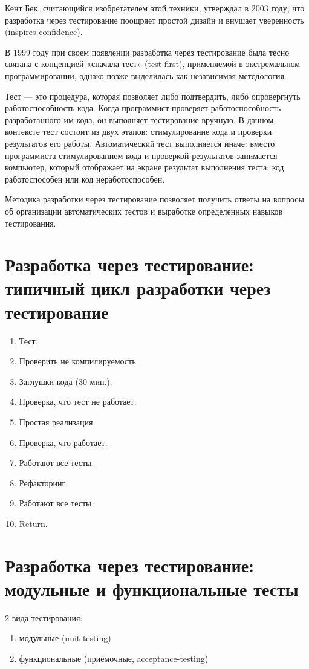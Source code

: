 \documentclass{article}
\let\stdsection\section
\renewcommand\section{\newpage\stdsection}
\begin{document}
    Кент Бек, считающийся изобретателем этой техники, утверждал в 2003 году, что разработка через тестирование поощряет простой дизайн и внушает уверенность (inspires confidence).

    В 1999 году при своем появлении разработка через тестирование была тесно связана с концепцией «сначала тест» (test-first), применяемой в экстремальном программировании, однако позже выделилась как независимая методология.

    Тест — это процедура, которая позволяет либо подтвердить, либо опровергнуть работоспособность кода. Когда программист проверяет работоспособность разработанного им кода, он выполняет тестирование вручную. В данном контексте тест состоит из двух этапов: стимулирование кода и проверки результатов его работы. Автоматический тест выполняется иначе: вместо программиста стимулированием кода и проверкой результатов занимается компьютер, который отображает на экране результат выполнения теста: код работоспособен или код неработоспособен. 

    Методика разработки через тестирование позволяет получить ответы на вопросы об организации автоматических тестов и выработке определенных навыков тестирования.

\section{Разработка через тестирование: типичный цикл разработки через тестирование}
    \begin{enumerate}
        \item Тест.
        \item Проверить не компилируемость.
        \item Заглушки кода (30 мин.).
        \item Проверка, что тест не работает.
        \item Простая реализация.
        \item Проверка, что работает.
        \item Работают все тесты.
        \item Рефакторинг.
        \item Работают все тесты.
        \item Return.
    \end{enumerate}

\section{Разработка через тестирование: модульные и функциональные тесты}
    2 вида тестирования:
    \begin{enumerate}
        \item модульные (unit-testing)
        \item функциональные (приёмочные, acceptance-testing)
    \end{enumerate}
\end{document}
